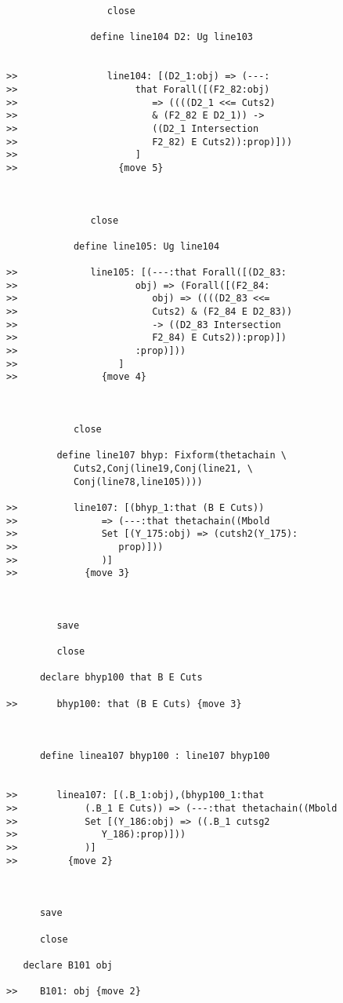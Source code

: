 \documentclass[12pt]{article}
\begin{document}
\begin{verbatim}
                  close

               define line104 D2: Ug line103


>>                line104: [(D2_1:obj) => (---:
>>                     that Forall([(F2_82:obj)
>>                        => ((((D2_1 <<= Cuts2)
>>                        & (F2_82 E D2_1)) ->
>>                        ((D2_1 Intersection
>>                        F2_82) E Cuts2)):prop)]))
>>                     ]
>>                  {move 5}



               close

            define line105: Ug line104

>>             line105: [(---:that Forall([(D2_83:
>>                     obj) => (Forall([(F2_84:
>>                        obj) => ((((D2_83 <<=
>>                        Cuts2) & (F2_84 E D2_83))
>>                        -> ((D2_83 Intersection
>>                        F2_84) E Cuts2)):prop)])
>>                     :prop)]))
>>                  ]
>>               {move 4}



            close

         define line107 bhyp: Fixform(thetachain \
            Cuts2,Conj(line19,Conj(line21, \
            Conj(line78,line105))))

>>          line107: [(bhyp_1:that (B E Cuts))
>>               => (---:that thetachain((Mbold
>>               Set [(Y_175:obj) => (cutsh2(Y_175):
>>                  prop)]))
>>               )]
>>            {move 3}



         save

         close

      declare bhyp100 that B E Cuts

>>       bhyp100: that (B E Cuts) {move 3}



      define linea107 bhyp100 : line107 bhyp100


>>       linea107: [(.B_1:obj),(bhyp100_1:that
>>            (.B_1 E Cuts)) => (---:that thetachain((Mbold
>>            Set [(Y_186:obj) => ((.B_1 cutsg2
>>               Y_186):prop)]))
>>            )]
>>         {move 2}



      save

      close

   declare B101 obj

>>    B101: obj {move 2}




\end{verbatim}
\end{document}
